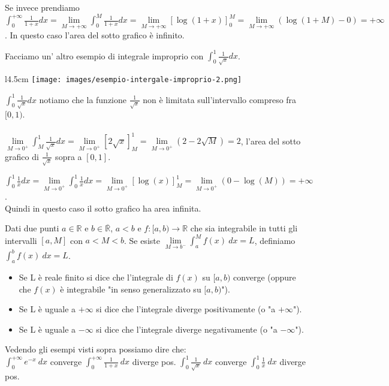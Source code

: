 \begin{example}
Se invece prendiamo $\int_0^{+\infty}\frac{1}{1+x}dx = \lim\limits_{M\to +\infty}\int_0^{M}\frac{1}{1+x}dx = \lim\limits_{M\to +\infty}[\log(1+x)]_0^M = \lim\limits_{M\to +\infty}(\log(1+M)-0) = +\infty$. In questo caso l'area del sotto grafico è infinito.
\end{example}
\newpage
\begin{example}
Facciamo un' altro esempio di integrale improprio con $\int_0^1 \frac{1}{\sqrt{x}}dx$.
\end{example}
\begin{wrapfigure}[5]{l}{4.5cm}
    \vspace{-25pt}
    \centering
    \texttt{[image: images/esempio-intergale-improprio-2.png]}
\end{wrapfigure}
$\int_0^1 \frac{1}{\sqrt{x}}dx$ notiamo che la funzione $\frac{1}{\sqrt{x}}$ non è limitata sull'intervallo compreso fra $[0,1)$.\\\\
$\lim\limits_{M\to 0^+}\int_M^1 \frac{1}{\sqrt{x}}dx = \lim\limits_{M\to 0^+}[2\sqrt{x}]_M^1 = \lim\limits_{M\to 0^+}(2-2\sqrt{M}) = 2$, l'area del sotto grafico di $\frac{1}{\sqrt{x}}$ sopra a $[0,1]$.
\vspace{10pt}
\begin{example}
$\int_0^1 \frac{1}{x}dx = \lim\limits_{M\to 0^+}\int_0^1 \frac{1}{x}dx = \lim\limits_{M\to 0^+}[\log(x)]_M^1 = \lim\limits_{M\to 0^+} (0-\log(M)) = + \infty$.\\
Quindi in questo caso il sotto grafico ha area infinita.
\end{example}
\begin{definition}
Dati due punti $a\in \mathbb{R}$ e $b \in \mathbb{\overline{R}}$, $a<b$ e $f:[a,b)\to \mathbb{R}$ che sia integrabile in tutti gli intervalli $[a,M]$ con $a<M<b$. Se esiste $\lim\limits_{M\to b^-}\int_a^M f(x)\:dx = L$, definiamo $\int_a^b f(x)\:dx = L$. 
\begin{itemize}
    \item Se L è reale finito si dice che l'integrale di $f(x)$ su $[a,b)$ converge (oppure che $f(x)$ è integrabile "in senso generalizzato su $[a,b)$").
    \item Se L è uguale a $+\infty$ si dice che l'integrale diverge positivamente (o "a $+\infty$").
    \item Se L è uguale a $-\infty$ si dice che l'integrale diverge negativamente (o "a $-\infty$").
\end{itemize}
\end{definition}
\hspace{-15pt}Vedendo gli esempi visti sopra possiamo dire che:\\
$\int_0^{+\infty}e^{-x}\:dx$ converge \hfill $\int_0^{+\infty}\frac{1}{1+x}\:dx$ diverge pos. \hfill $\int_0^1 \frac{1}{\sqrt{x}}\:dx$ converge \hfill $\int_0^1\frac{1}{x}\:dx$ diverge pos.

